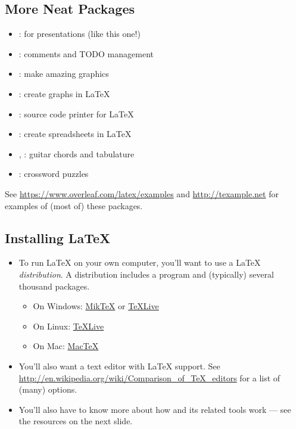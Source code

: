 \documentclass{beamer}
\begin{document}
\subsection{More Neat Packages}
\begin{frame}{\insertsubsection}
\begin{itemize}
\item {}: for presentations (like this one!)
\item {}: comments and TODO management
\item {}: make amazing graphics
\item {}: create graphs in \LaTeX
\item {}: source code printer for \LaTeX
\item {}: create spreadsheets in \LaTeX
\item {}, : guitar chords and tabulature
\item {}: crossword puzzles
\end{itemize}
See \url{https://www.overleaf.com/latex/examples} and \url{http://texample.net}
for examples of (most of) these packages.
\end{frame}

\subsection{Installing \LaTeX{}}
\begin{frame}{\insertsubsection}
\begin{itemize}
\item To run \LaTeX{} on your own computer, you'll want to use a \LaTeX{}
\emph{distribution}. A distribution includes a  program
and (typically) several thousand packages.
\begin{itemize}
\item On Windows: \href{http://miktex.org/}{Mik\TeX} or \href{http://tug.org/texlive/}{\TeX Live}
\item On Linux: \href{http://tug.org/texlive/}{\TeX Live}
\item On Mac: \href{http://tug.org/mactex/}{Mac\TeX}
\end{itemize}
\item You'll also want a text editor with \LaTeX{} support. See \url{http://en.wikipedia.org/wiki/Comparison_of_TeX_editors} for a list of (many) options.
\item You'll also have to know more about how  and its related tools
work --- see the resources on the next slide.
\end{itemize}
\end{frame}
\end{document}
